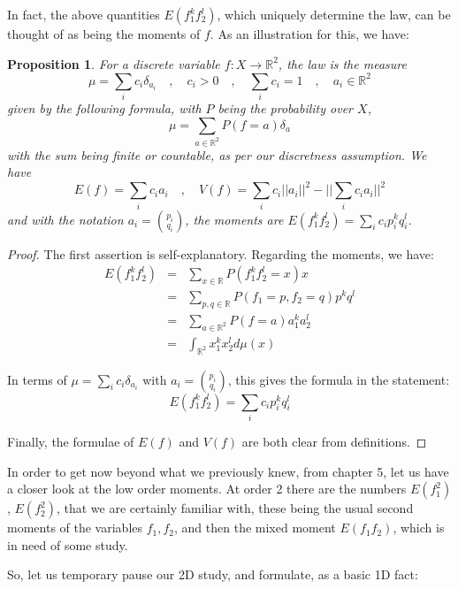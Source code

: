 \documentclass[12pt]{amsbook}
\newtheorem{proposition}[theorem]{Proposition}
\begin{document}
In fact, the above quantities $E(f_1^kf_2^l)$, which uniquely determine the law, can be thought of as being the moments of $f$. As an illustration for this, we have:


\begin{proposition}
For a discrete variable $f:X\to\mathbb R^2$, the law is the measure
$$\mu=\sum_i c_i\delta_{a_i}\quad,\quad c_i>0\quad,\quad\sum_ic_i=1\quad,\quad a_i\in\mathbb R^2$$
given by the following formula, with $P$ being the probability over $X$,
$$\mu=\sum_{a\in\mathbb R^2}P(f=a)\delta_a$$
with the sum being finite or countable, as per our discretness assumption. We have
$$E(f)=\sum_ic_ia_i\quad,\quad V(f)=\sum_ic_i||a_i||^2-\Big|\Big|\sum_ic_ia_i\Big|\Big|^2$$
and with the notation $a_i=\binom{p_i}{q_i}$, the moments are $E(f_1^kf_2^l)=\sum_ic_ip_i^kq_i^l$.
\end{proposition}

\begin{proof}
The first assertion is self-explanatory. Regarding the moments, we have:
\begin{eqnarray*}
E(f_1^kf_2^l)
&=&\sum_{x\in\mathbb R}P(f_1^kf_2^l=x)x\\
&=&\sum_{p,q\in\mathbb R}P(f_1=p,f_2=q)p^kq^l\\
&=&\sum_{a\in\mathbb R^2}P(f=a)a_1^ka_2^l\\
&=&\int_{\mathbb R^2}x_1^kx_2^ld\mu(x)
\end{eqnarray*}

In terms of $\mu=\sum_i c_i\delta_{a_i}$ with $a_i=\binom{p_i}{q_i}$, this gives the formula in the statement:
$$E(f_1^kf_2^l)=\sum_ic_ip_i^kq_i^l$$

Finally, the formulae of $E(f)$ and $V(f)$ are both clear from definitions.
\end{proof}

In order to get now beyond what we previously knew, from chapter 5, let us have a closer look at the low order moments. At order 2 there are the numbers $E(f_1^2)$, $E(f_2^2)$, that we are certainly familiar with, these being the usual second moments of the variables $f_1,f_2$, and then the mixed moment $E(f_1f_2)$, which is in need of some study.

\bigskip

So, let us temporary pause our 2D study, and formulate, as a basic 1D fact:

\end{document}
